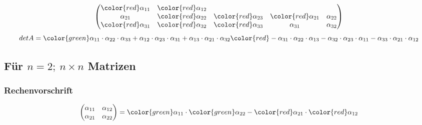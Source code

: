 \begin{enumerate}
\[\begin{pmatrix}
        {\color{red} \alpha_{11}} &  {\color{red} \alpha_{12}} \\ \alpha_{21}& {\color{red} \alpha_{22}} &{\color{red} \alpha_{23}} & {\color{red} \alpha_{21}} &  \alpha_{22}\\ {\color{red} \alpha_{31}}&{\color{red} \alpha_{32}} & {\color{red} \alpha_{33 }} & \alpha_{31} &
    \alpha_{32} \end{pmatrix}\] \newline
    \newline \[detA= \color{green}\alpha_{11} \cdot \alpha_{22} \cdot \alpha_{33} + \alpha_{12} \cdot \alpha_{23} \cdot \alpha_{31} + \alpha_{13} \cdot \alpha_{21} \cdot \alpha_{32} \color{red}
    - \alpha_{31} \cdot \alpha_{22} \cdot \alpha_{13} - \alpha_{32} \cdot \alpha_{23} \cdot \alpha_{11} - \alpha_{33} \cdot \alpha_{21} \cdot \alpha_{12}\]
\end{enumerate}\newline
\newline
\subsection{Für $n = 2 ;\ n\times n$ Matrizen}

\subsubsection{Rechenvorschrift}
\[\begin{pmatrix}\alpha_{11} & \alpha_{12}\\\alpha_{21}  & \alpha_{22}\end{pmatrix} = {\color{green} \alpha_{11}} \cdot {\color{green} \alpha_{22}} -
    {\color{red} \alpha_{21}} \cdot {\color{red} \alpha_{12}}\]




